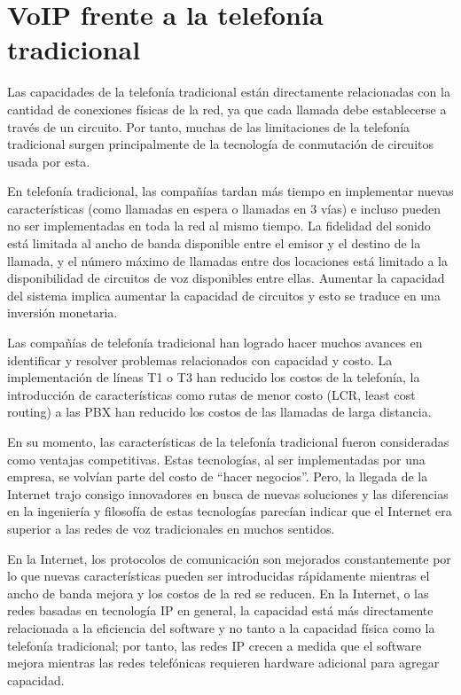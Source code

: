 	
\section{VoIP frente a la telefonía tradicional}
	
	Las capacidades de la telefonía tradicional están directamente relacionadas con la cantidad de conexiones físicas de la red, ya que cada llamada debe establecerse a través de un circuito. Por tanto, muchas de las limitaciones de la telefonía tradicional surgen principalmente de la tecnología de conmutación de circuitos 
	usada por esta.
	
	En telefonía tradicional, las compañías tardan más tiempo en implementar nuevas características (como llamadas en espera o llamadas en 3 vías) e incluso pueden no ser implementadas en toda la red al mismo tiempo. La fidelidad del sonido está limitada al ancho de banda disponible entre el emisor y el destino de la 
	llamada, y el número máximo de llamadas entre dos locaciones está limitado a la disponibilidad de circuitos de voz disponibles entre ellas. Aumentar la capacidad del sistema implica aumentar la capacidad de circuitos y esto se traduce en una inversión monetaria. 
	 
	Las compañías de telefonía tradicional han logrado hacer muchos avances en identificar y resolver problemas relacionados con capacidad y costo. La implementación de líneas T1 o T3 han reducido los costos de la telefonía, la introducción de características como rutas de menor costo (LCR, least cost routing) a las PBX han reducido los costos de las llamadas de larga distancia.
	 
	En su momento, las características de la telefonía tradicional fueron consideradas como ventajas competitivas. Estas tecnologías, al ser  implementadas por una empresa, se volvían parte del costo de “hacer negocios”. Pero, la llegada de la Internet trajo consigo innovadores en busca de nuevas soluciones y las diferencias en la ingeniería y filosofía de estas tecnologías parecían indicar que el Internet era superior a las redes de voz tradicionales en muchos sentidos.
	 
	En la Internet, los protocolos de comunicación son mejorados constantemente por lo que nuevas características pueden ser introducidas rápidamente mientras el ancho de banda mejora y los costos de la red se reducen. En la Internet, o las redes basadas en tecnología IP en general, la capacidad está más directamente relacionada a la eficiencia del software y no tanto a la 
	capacidad física como la telefonía tradicional; por tanto, las redes IP crecen a medida que el software mejora mientras las redes telefónicas requieren hardware adicional para agregar capacidad. 
	 
